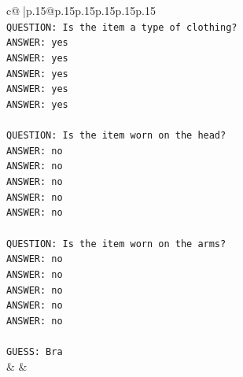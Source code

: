 \documentclass{article}
\begin{document}
{\begin{supertabular}{c@{$\;$}|p{.15\linewidth}@{}p{.15\linewidth}p{.15\linewidth}p{.15\linewidth}p{.15\linewidth}p{.15\linewidth}}
{{{\\ 
\texttt{QUESTION: Is the item a type of clothing?  } \\
\texttt{ANSWER: yes  } \\
\texttt{ANSWER: yes  } \\
\texttt{ANSWER: yes  } \\
\texttt{ANSWER: yes  } \\
\texttt{ANSWER: yes  } \\
\\ 
\texttt{QUESTION: Is the item worn on the head?  } \\
\texttt{ANSWER: no  } \\
\texttt{ANSWER: no  } \\
\texttt{ANSWER: no  } \\
\texttt{ANSWER: no  } \\
\texttt{ANSWER: no  } \\
\\ 
\texttt{QUESTION: Is the item worn on the arms?  } \\
\texttt{ANSWER: no  } \\
\texttt{ANSWER: no  } \\
\texttt{ANSWER: no  } \\
\texttt{ANSWER: no  } \\
\texttt{ANSWER: no  } \\
\\ 
\texttt{GUESS: Bra} \\
            }
        }
    }
    & & \\ \\


\end{supertabular}}
\end{document}
